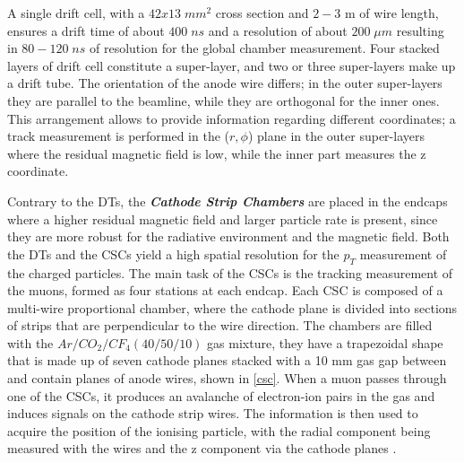 A single drift cell, with a $42 x 13\; mm^2$ cross section and $2-3$ m of wire length, ensures a drift time of about $400\; ns$ and a resolution of about $200\;\mu m$ resulting in $80-120\;ns$ of resolution for the global chamber measurement. Four stacked layers of drift cell constitute a super-layer, and two or three super-layers make up a drift tube. The orientation of the anode wire differs; in the outer super-layers they are parallel to the beamline, while they are orthogonal for the inner ones. This arrangement allows to provide information regarding different coordinates; a track measurement is performed in the ($r, \phi$) plane in the outer super-layers where the residual magnetic field is low, while the inner part measures the z coordinate.

Contrary to the DTs, the \emph{\textbf{Cathode Strip Chambers}} are placed in the endcaps where a higher residual magnetic field and larger particle rate is present, since they are more robust for the radiative environment and the magnetic field. Both the DTs and the CSCs yield a high spatial resolution for the $p_T$ measurement of the charged particles. The main task of the CSCs is the tracking measurement of the muons, formed as four stations at each endcap. Each CSC is composed of a multi-wire proportional chamber, where the cathode plane is divided into sections of strips that are perpendicular to the wire direction. The chambers are filled with the $Ar/CO_2/CF_4 (40/50/10)$ gas mixture, they have a trapezoidal shape that is made up of seven cathode planes stacked with a 10 mm gas gap between and contain planes of anode wires, shown in \autoref{csc}. When a muon passes through one of the CSCs, it produces an avalanche of electron-ion pairs in the gas and induces signals on the cathode strip wires. The information is then used to acquire the position of the ionising particle, with the radial component being measured with the wires and the z component via the cathode planes \cite{Sirunyan_2018}.

